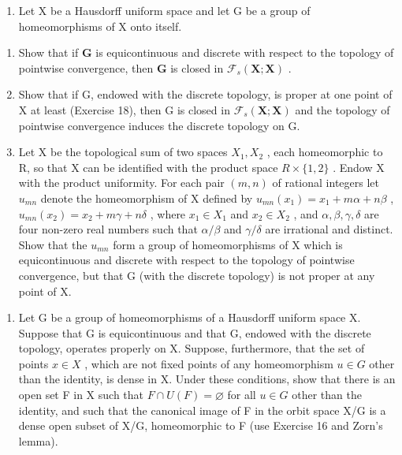 \begin{enumerate}
\def\labelenumi{\arabic{enumi})}
\setcounter{enumi}{18}
\tightlist
\item
  Let X be a Hausdorff uniform space and let G be a group of homeomorphisms of X onto itself.
\end{enumerate}

\begin{enumerate}
\def\labelenumi{\alph{enumi})}
\item
  Show that if \(\mathbf{G}\) is equicontinuous and discrete with respect to the topology of pointwise convergence, then \(\mathbf{G}\) is closed in \(\mathcal{F}_s(\mathbf{X};\mathbf{X})\) .
\item
  Show that if G, endowed with the discrete topology, is proper at one point of X at least (Exercise 18), then G is closed in \(\mathcal{F}_{s}(\mathbf{X};\mathbf{X})\) and the topology of pointwise convergence induces the discrete topology on G.
\item
  Let X be the topological sum of two spaces \(X_{1}, X_{2}\) , each homeomorphic to R, so that X can be identified with the product space \(R \times \{1, 2\}\) . Endow X with the product uniformity. For each pair \((m, n)\) of rational integers let \(u_{mn}\) denote the homeomorphism of X defined by \(u_{mn}(x_{1}) = x_{1} + m\alpha + n\beta\) , \(u_{mn}(x_{2}) = x_{2} + m\gamma + n\delta\) , where \(x_{1} \in X_{1}\) and \(x_{2} \in X_{2}\) , and \(\alpha, \beta, \gamma, \delta\) are four non-zero real numbers such that \(\alpha/\beta\) and \(\gamma/\delta\) are irrational and distinct. Show that the \(u_{mn}\) form a group of homeomorphisms of X which is equicontinuous and discrete with respect to the topology of pointwise convergence, but that G (with the discrete topology) is not proper at any point of X.
\end{enumerate}

\begin{enumerate}
\def\labelenumi{\arabic{enumi})}
\setcounter{enumi}{19}
\tightlist
\item
  Let G be a group of homeomorphisms of a Hausdorff uniform space X. Suppose that G is equicontinuous and that G, endowed with the discrete topology, operates properly on X. Suppose, furthermore, that the set of points \(x \in X\) , which are not fixed points of any homeomorphism \(u \in G\) other than the identity, is dense in X. Under these conditions, show that there is an open set F in X such that \(F \cap U(F) = \varnothing\) for all \(u \in G\) other than the identity, and such that the canonical image of F in the orbit space X/G is a dense open subset of X/G, homeomorphic to F (use Exercise 16 and Zorn's lemma).
\end{enumerate}

